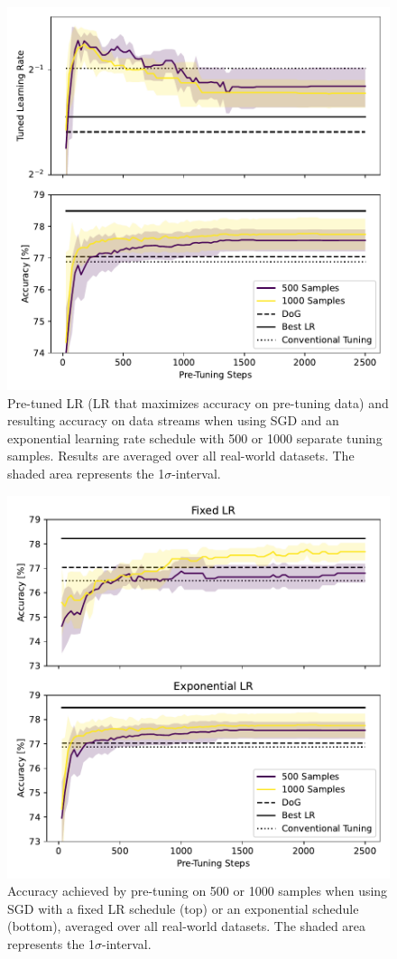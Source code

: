 \documentclass[letterpaper]{article} %
\begin{document}
\begin{figure}
	\centering
	\includegraphics[width=.45\textwidth]{figures/pretune_1x64_acc_lr_exp_schedule.pdf}
	\caption{Pre-tuned LR (LR that maximizes accuracy on pre-tuning data) and resulting accuracy on data streams when using SGD and an exponential learning rate schedule with 500 or 1000 separate tuning samples. Results are averaged over all real-world datasets. The shaded area represents the 1$\sigma$-interval.}\label{fig:pretune_lr_accuracy}
\end{figure}

\begin{figure}
	\centering
	\includegraphics[width=.47\textwidth]{figures/pretune_1x64_fixed_vs_exp_schedule.pdf}
	\caption{Accuracy achieved by pre-tuning on 500 or 1000 samples when using SGD with a fixed LR schedule (top) or an exponential schedule (bottom), averaged over all real-world datasets. The shaded area represents the 1$\sigma$-interval.}\label{fig:pretune_fixed_vs_exp_lr}
\end{figure}
\end{document}
